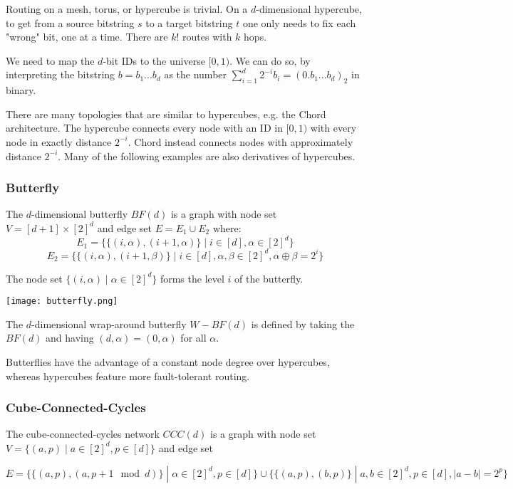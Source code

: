Routing on a mesh, torus, or hypercube is trivial. On a $d$-dimensional hypercube, to get from a source bitstring $s$ to a target bitstring $t$ one only needs to fix each "wrong" bit, one at a time. There are $k!$ routes with $k$ hops. \medskip

We need to map the $d$-bit IDs to the universe $[0, 1)$. We can do so, by interpreting the bitstring $b = b_1 ... b_d$ as the number $\sum_{i=1}^d 2^{-i} b_i = (0.b_1 ... b_d)_2$ in binary. \medskip

There are many topologies that are similar to hypercubes, e.g. the Chord architecture. The hypercube connects every node with an ID in $[0,1)$ with every node in exactly distance $2^{-i}$. Chord instead connects nodes with approximately distance $2^{-i}$. Many of the following examples are also derivatives of hypercubes.

\subsubsection{Butterfly}

The $d$-dimensional butterfly $BF(d)$ is a graph with node set $V = [d+1] \times [2]^d$ and edge set $E = E_1 \cup E_2$ where:
$$E_1 = \{\{ (i, \alpha), (i+1, \alpha)\} \; | \; i \in [d], \alpha \in [2]^d\}$$
$$E_2 = \{\{ (i, \alpha), (i+1, \beta)\} \; | \; i \in [d], \alpha, \beta \in [2]^d, \alpha \oplus \beta = 2^i \}$$

The node set $\{(i, \alpha) \; | \; \alpha \in [2]^d\}$ forms the level $i$ of the butterfly. 
\begin{center}
	\texttt{[image: butterfly.png]}
\end{center}

The $d$-dimensional wrap-around butterfly $W - BF(d)$ is defined by taking the $BF(d)$ and having $(d, \alpha) = (0, \alpha)$ for all $\alpha$. \medskip

Butterflies have the advantage of a constant node degree over hypercubes, whereas hypercubes feature more fault-tolerant routing.

\subsubsection{Cube-Connected-Cycles}

The cube-connected-cycles network $CCC(d)$ is a graph with node set $V = \{ (a,p) \; | \; a \in [2]^d, p \in [d] \} $ and edge set \smallskip

$E = \{\{ (a,p), (a, p+1 \mod d) \} \; | \; \alpha \in [2]^d, p \in [d]\} \cup \{\{(a,p), (b,p)\} \; | \; a,b \in [2]^d, p \in [d], |a-b| = 2^p \}$ \smallskip

